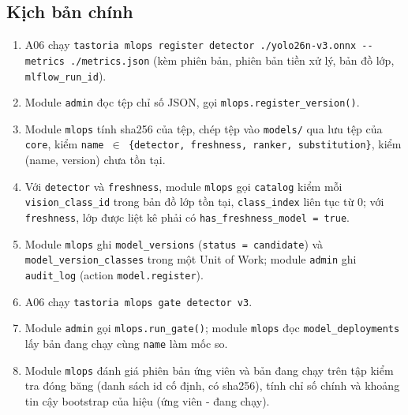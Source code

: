\subsection{Kịch bản chính}
\begin{enumerate}
\item A06 chạy {\small\texttt{tastoria mlops register detector .\allowbreak{}/\allowbreak{}\allowbreak{}yolo26n-\allowbreak{}v3.\allowbreak{}onnx -\allowbreak{}-\allowbreak{}metrics .\allowbreak{}/\allowbreak{}\allowbreak{}metrics.\allowbreak{}json}} (kèm phiên bản, phiên bản tiền xử lý, bản đồ lớp, {\small\texttt{mlflow\_\allowbreak{}\allowbreak{}run\_\allowbreak{}\allowbreak{}id}}).
\item Module {\small\texttt{admin}} đọc tệp chỉ số JSON, gọi {\small\texttt{mlops.\allowbreak{}register\_\allowbreak{}\allowbreak{}version()}}.
\item Module {\small\texttt{mlops}} tính sha256 của tệp, chép tệp vào {\small\texttt{models/\allowbreak{}\allowbreak{}}} qua lưu tệp của {\small\texttt{core}}, kiểm {\small\texttt{name \ensuremath{\in} \{detector, freshness, ranker, substitution\}}}, kiểm (name, version) chưa tồn tại.
\item Với {\small\texttt{detector}} và {\small\texttt{freshness}}, module {\small\texttt{mlops}} gọi {\small\texttt{catalog}} kiểm mỗi {\small\texttt{vision\_\allowbreak{}\allowbreak{}class\_\allowbreak{}\allowbreak{}id}} trong bản đồ lớp tồn tại, {\small\texttt{class\_\allowbreak{}\allowbreak{}index}} liên tục từ 0; với {\small\texttt{freshness}}, lớp được liệt kê phải có {\small\texttt{has\_\allowbreak{}\allowbreak{}freshness\_\allowbreak{}\allowbreak{}model = true}}.
\item Module {\small\texttt{mlops}} ghi {\small\texttt{model\_\allowbreak{}\allowbreak{}versions}} ({\small\texttt{status = candidate}}) và {\small\texttt{model\_\allowbreak{}\allowbreak{}version\_\allowbreak{}\allowbreak{}classes}} trong một Unit of Work; module {\small\texttt{admin}} ghi {\small\texttt{audit\_\allowbreak{}\allowbreak{}log}} (action {\small\texttt{model.\allowbreak{}register}}).
\item A06 chạy {\small\texttt{tastoria mlops gate detector v3}}.
\item Module {\small\texttt{admin}} gọi {\small\texttt{mlops.\allowbreak{}run\_\allowbreak{}\allowbreak{}gate()}}; module {\small\texttt{mlops}} đọc {\small\texttt{model\_\allowbreak{}\allowbreak{}deployments}} lấy bản đang chạy cùng {\small\texttt{name}} làm mốc so.
\item Module {\small\texttt{mlops}} đánh giá phiên bản ứng viên và bản đang chạy trên tập kiểm tra đóng băng (danh sách id cố định, có sha256), tính chỉ số chính và khoảng tin cậy bootstrap của hiệu (ứng viên - đang chạy).

\end{enumerate}
